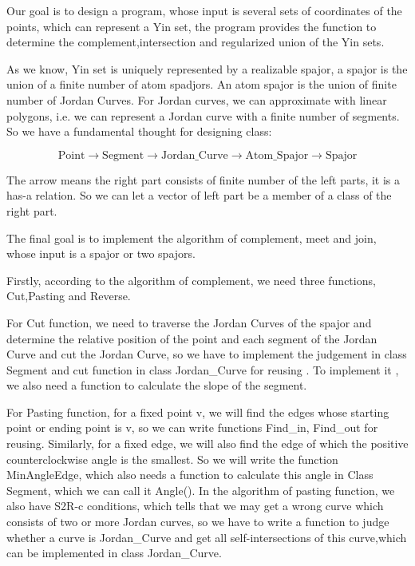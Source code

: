 \documentclass[twoside,a4paper]{article}
\begin{document}

\pagestyle{fancy}
\fancyhead{}

Our goal is to design a program, whose input is several sets of coordinates
of the points, which can represent a Yin set, the program provides the
function to determine the complement,intersection and regularized
union of the Yin sets.

As we know, Yin set is uniquely represented by a realizable spajor, a
spajor is the union of a finite number of atom spadjors. An atom
spajor is the union of finite number of Jordan Curves. For Jordan
curves, we can approximate with linear polygons, i.e. we can represent
a Jordan curve with a finite number of segments. So we have a
fundamental thought for designing class:

$$
\mbox{Point}\rightarrow\mbox{Segment}\rightarrow\mbox{Jordan\_Curve}
\rightarrow\mbox{Atom\_Spajor}\rightarrow\mbox{Spajor}
$$

The arrow means the right part consists of finite number of the left
parts, it is a has-a relation. So we can let a vector of left part be
a member of a class of the right part.

The final goal is to implement the algorithm of complement, meet and
join, whose input is a spajor or two spajors.

Firstly, according to the algorithm of complement, we need three
functions, Cut,Pasting and Reverse.

For Cut function, we need to traverse the Jordan Curves of the spajor
and determine the relative position of the point and each segment of the
Jordan Curve and cut the Jordan Curve, so we have to implement the
judgement in class Segment and cut function in class Jordan\_Curve for
reusing . To implement it , we also need a function to calculate the slope of the
segment.

For Pasting function, for a fixed point v, we will find the edges whose
starting point or ending point is v, so we can write functions
Find\_in, Find\_out for reusing. Similarly, for a fixed edge, we will
also find the edge of which the positive counterclockwise angle is the
smallest. So we will write the function MinAngleEdge, which also needs
a function to calculate this angle in Class Segment, which we can call
it Angle(). In the algorithm of pasting function, we also have S2R-c
conditions, which tells that we may get a wrong curve which consists
of two or more Jordan curves, so we have to write a function to judge
whether a curve is Jordan\_Curve and get all self-intersections of this
curve,which can be implemented in class Jordan\_Curve.
\end{document}
